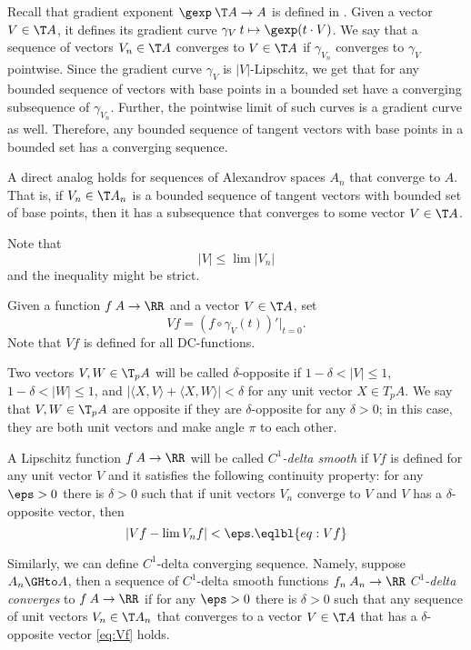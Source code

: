 Recall that gradient exponent $\gexp\: \T A\to A$ is defined in \cite{AKP}.
Given a vector $V\in \T A$, it defines its gradient curve $\gamma_{V}\:t\mapsto \gexp (t\cdot V)$.
We say that a sequence of vectors $V_n\in \T A$ converges to $V\in \T A$ if $\gamma_{V_n}$ converges to $\gamma_V$ pointwise.
Since the gradient curve $\gamma_V$ is $|V|$-Lipschitz, we get that for any bounded sequence of vectors with base points in a bounded set have a converging subsequence of $\gamma_{V_n}$.
Further, the pointwise limit of such curves is a gradient curve as well.
Therefore, any bounded sequence of tangent vectors with base points in a bounded set has a converging sequence.

A direct analog holds for sequences of Alexandrov spaces $A_n$ that converge to $A$.
That is, if $V_n\in \T A_n$ is a bounded sequence of tangent vectors with bounded set of base points, then it has a subsequence that converges to some vector $V\in \T A$.

Note that 
\[|V|\le \lim |V_n|\]
and the inequality might be strict.




Given a function $f\:A\to \RR$ and a vector $V\in \T A$, set
\[Vf=(f\circ\gamma_V(t))'|_{t=0}.\]
Note that $Vf$ is defined for all DC-functions.

Two vectors $V,W\in \T_pA$ will be called $\delta$-opposite if
$1-\delta< |V|\le 1$,
$1-\delta< |W|\le 1$,
and $|\langle X,V\rangle +\langle X,W\rangle|<\delta$ for any unit vector $X\in T_p A$.
We say that $V,W\in \T_pA$ are opposite if they are $\delta$-opposite for any $\delta>0$;
in this case, they are both unit vectors and make angle $\pi$ to each other.  

A Lipschitz function $f\:A\to \RR$ will be called \emph{$C^1$-delta smooth} if $Vf$ is defined for any unit vector $V$ and it satisfies the following continuity property:
for any $\eps>0$ there is $\delta>0$ such that if unit vectors $V_n$ converge to $V$ and $V$ has a $\delta$-opposite vector, then 
\[|Vf-\lim V_nf|<\eps.\eqlbl{eq:Vf}\]

Similarly, we can define $C^1$-delta converging sequence. Namely, suppose $A_n\GHto A$, then a sequence of $C^1$-delta smooth functions $f_n\:A_n\to\RR$ \emph{$C^1$-delta converges} to $f\:A\to \RR$ if for any $\eps>0$ there is $\delta>0$ such that any sequence of unit vectors $V_n\in \T A_n$ that converges to a vector $V\in \T A$ that has a $\delta$-opposite vector \ref{eq:Vf} holds. 


